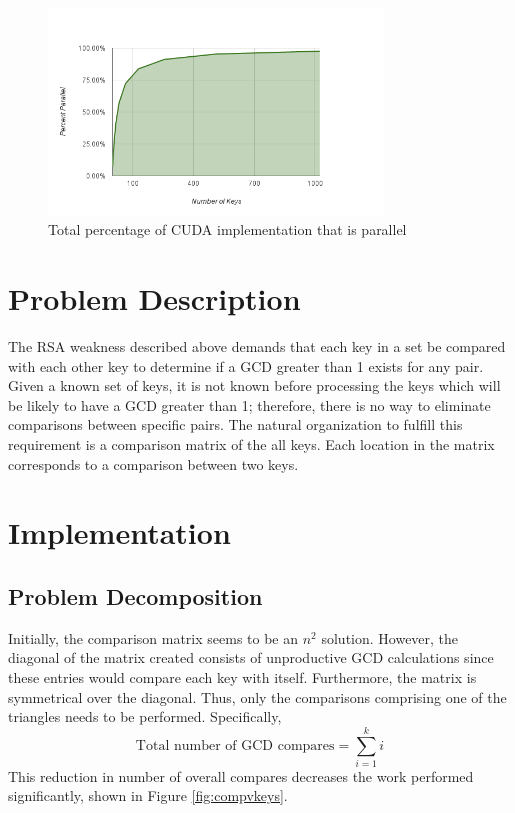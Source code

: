 \documentclass[12pt]{ucthesis}
\begin{document}
\begin{figure}
   \centering
   \includegraphics[width=3.5in]{chart_7.png}
   \caption{Total percentage of CUDA implementation that is parallel}
   \label{fig:parPercent}
\end{figure}

\section{Problem Description}
\label{sec:probdesc}
The RSA weakness described above demands that each key in a set be 
compared with each other key to determine if a GCD greater than 1 exists for 
any pair. Given a known set of keys, it is not known before processing 
the keys which will be likely to have a GCD greater than 1; therefore, there 
is no way to eliminate comparisons between specific pairs. The natural 
organization to fulfill this requirement is a comparison matrix of the all 
keys. Each location in the matrix corresponds to a comparison between two 
keys.

\section{Implementation}
\label{sec:impl}
\subsection{Problem Decomposition}
\label{subsec:probdecomp}
Initially, the comparison matrix seems to be an $n^2$ solution. However, the 
diagonal of the matrix created consists of unproductive GCD calculations since 
these entries would compare each key with itself. Furthermore, the matrix is 
symmetrical over the diagonal. Thus, only the comparisons comprising one of 
the triangles needs to be performed. Specifically, 
\begin{equation}
   \label{eq:gcd}
   \mbox{Total number of GCD compares} = \sum_{i=1}^k i
\end{equation}
This reduction in number of overall compares decreases the work 
performed significantly, shown in Figure \ref{fig:compvkeys}. 
\end{document}

